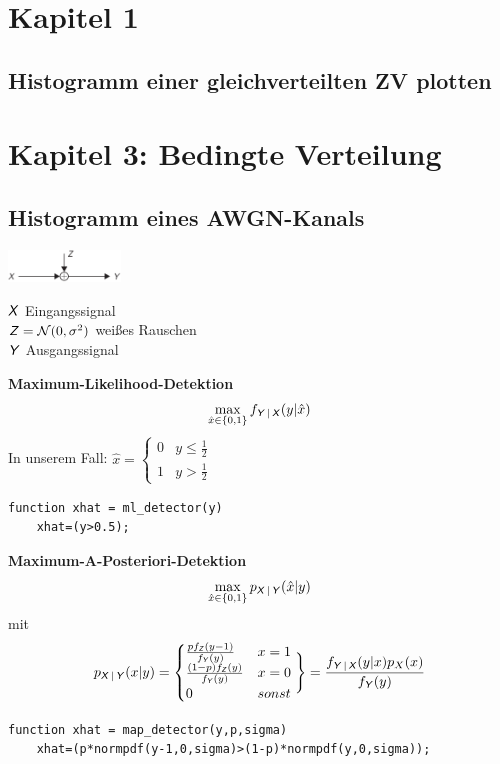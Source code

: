 \documentclass[deutsch]{latex4ei/latex4ei_sheet}
\begin{document}
\section{Kapitel 1}
\begin{sectionbox}
	\subsection{Histogramm einer gleichverteilten ZV plotten}
	
\end{sectionbox}



\section{Kapitel 3: Bedingte Verteilung}
\begin{sectionbox}
	\subsection{Histogramm eines AWGN-Kanals}
	\parbox{3.3cm}{
	\includegraphics[width = 3cm]{img/awgn-channel.png}
	}
	\parbox{4cm}{
		$\operatorname{\textsf{\textit{X}}}$ Eingangssignal\\
		$\operatorname{\textsf{\textit{Z}}} = \mathcal N(0, \sigma^2)$ weißes Rauschen\\
		$\operatorname{\textsf{\textit{Y}}}$ Ausgangssignal
		}
	

	\textbf{Maximum-Likelihood-Detektion}
	\[ \max_{\hat x \in \{0,1\}}f_{\operatorname{\textsf{\textit{Y}}}|\operatorname{\textsf{\textit{X}}}}(y|\hat x) \]
	In unserem Fall: $\hat x = \begin{cases}
	0 & y\le \frac{1}{2}\\
	1 & y > \frac{1}{2}
	\end{cases}$
	\begin{lstlisting}[gobble=4]
	function xhat = ml_detector(y)
	xhat=(y>0.5);
	\end{lstlisting}
	\textbf{Maximum-A-Posteriori-Detektion}
	\[\max_{\hat x \in \{0,1\}} p_{\operatorname{\textsf{\textit{X}}}|\operatorname{\textsf{\textit{Y}}}}(\hat x|y)\] mit
	\[p_{\operatorname{\textsf{\textit{X}}}|\operatorname{\textsf{\textit{Y}}}}(x|y)=\begin{cases}
	 \frac{p f_{\operatorname{\textsf{\textit{Z}}}}(y-1)}{f_{\operatorname{\textsf{\textit{Y}}}}(y)} & x=1\\
	\frac{(1-p)f_{\operatorname{\textsf{\textit{Z}}}}(y)}{f_{\operatorname{\textsf{\textit{Y}}}}(y)} & x=0\\
	0 & sonst
	\end{cases} 
	\Bigg\} = \frac{f_{\operatorname{\textsf{\textit{Y}}}|\operatorname{\textsf{\textit{X}}}}(y|x)p_{X}(x)}{f_{\operatorname{\textsf{\textit{Y}}}}(y)}\]
	\begin{lstlisting}[gobble=4]
	function xhat = map_detector(y,p,sigma)
	xhat=(p*normpdf(y-1,0,sigma)>(1-p)*normpdf(y,0,sigma));
	\end{lstlisting}
	\vspace{-7pt}
\end{sectionbox}
\end{document}
